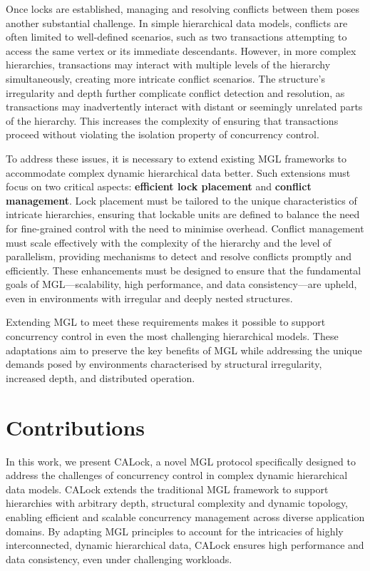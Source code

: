 Once locks are established, managing and resolving conflicts between them poses another substantial challenge. In simple hierarchical data models, conflicts are often limited to well-defined scenarios, such as two transactions attempting to access the same vertex or its immediate descendants. However, in more complex hierarchies, transactions may interact with multiple levels of the hierarchy simultaneously, creating more intricate conflict scenarios. The structure's irregularity and depth further complicate conflict detection and resolution, as transactions may inadvertently interact with distant or seemingly unrelated parts of the hierarchy. This increases the complexity of ensuring that transactions proceed without violating the isolation property of concurrency control.


To address these issues, it is necessary to extend existing MGL frameworks to accommodate complex dynamic hierarchical data better. Such extensions must focus on two critical aspects: \textbf{efficient lock placement} and \textbf{conflict management}. Lock placement must be tailored to the unique characteristics of intricate hierarchies, ensuring that lockable units are defined to balance the need for fine-grained control with the need to minimise overhead. Conflict management must scale effectively with the complexity of the hierarchy and the level of parallelism, providing mechanisms to detect and resolve conflicts promptly and efficiently. These enhancements must be designed to ensure that the fundamental goals of MGL—scalability, high performance, and data consistency—are upheld, even in environments with irregular and deeply nested structures.

Extending MGL to meet these requirements makes it possible to support concurrency control in even the most challenging hierarchical models. These adaptations aim to preserve the key benefits of MGL while addressing the unique demands posed by environments characterised by structural irregularity, increased depth, and distributed operation.



\section*{Contributions}

In this work, we present CALock, a novel MGL protocol specifically designed to address the challenges of concurrency control in complex dynamic hierarchical data models. CALock extends the traditional MGL framework to support hierarchies with arbitrary depth, structural complexity and dynamic topology, enabling efficient and scalable concurrency management across diverse application domains. By adapting MGL principles to account for the intricacies of highly interconnected, dynamic hierarchical data, CALock ensures high performance and data consistency, even under challenging workloads.

